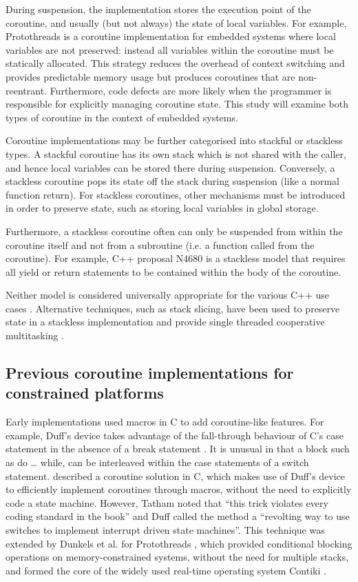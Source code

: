 \documentclass[format=acmsmall, review=false, screen=false]{acmart}
\begin{document}
During suspension, the implementation stores the execution point of the coroutine, and usually (but not always) the state of local variables. For example, Protothreads \cite{Dunkels2006} is a coroutine implementation for embedded systems where local variables are not preserved: instead all variables within the coroutine must be statically allocated. This strategy reduces the overhead of context switching and provides predictable memory usage but produces coroutines that are non-reentrant. Furthermore, code defects are more likely when the programmer is responsible for explicitly managing coroutine state. This study will examine both types of coroutine in the context of embedded systems.

Coroutine implementations may be further categorised into stackful or stackless types. A stackful coroutine has its own stack which is not shared with the caller, and hence local variables can be stored there during suspension. Conversely, a stackless coroutine pops its state off the stack during suspension (like a normal function return). For stackless coroutines, other mechanisms must be introduced in order to preserve state, such as storing local variables in global storage. 

Furthermore, a stackless coroutine often can only be suspended from within the coroutine itself and not from a subroutine (i.e. a function called from the coroutine). For example, C++ proposal N4680 is a stackless model that requires all yield or return statements to be contained within the body of the coroutine.

Neither model is considered universally appropriate for the various C++ use cases \cite{Goodspeed2014, Riegel2015}. Alternative techniques, such as stack slicing, have been used to preserve state in a stackless implementation and provide single threaded cooperative multitasking \cite{Tismer2000, Tismer2018}.

\subsection{Previous coroutine implementations for constrained platforms}
\label{previous-implementations}

Early implementations used macros in C to add coroutine-like features. For example, Duff’s device takes advantage of the fall-through behaviour of C’s case statement in the absence of a break statement \cite{Duff88}. It is unusual in that a block such as do … while, can be interleaved within the case statements of a switch statement.  described a coroutine solution in C, which makes use of Duff’s device to efficiently implement coroutines through macros, without the need to explicitly code a state machine. However, Tatham noted that “this trick violates every coding standard in the book” and Duff called the method a “revolting way to use switches to implement interrupt driven state machines”. This technique was extended by Dunkels et al. for Protothreads \cite{Dunkels2006}, which provided conditional blocking operations on memory-constrained systems, without the need for multiple stacks, and formed the core of the widely used real-time operating system Contiki \cite{Dunkels2004}.
\end{document}
